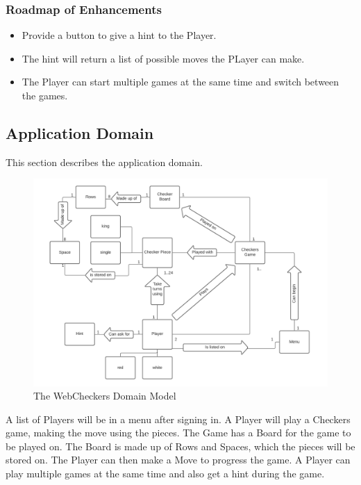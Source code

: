 \hypertarget{roadmap-of-enhancements}{%
\subsubsection{Roadmap of Enhancements}\label{roadmap-of-enhancements}}

\begin{itemize}
\tightlist
\item
  Provide a button to give a hint to the Player.
\item
  The hint will return a list of possible moves the PLayer can make.
\item
  The Player can start multiple games at the same time and switch
  between the games.
\end{itemize}

\hypertarget{application-domain}{%
\subsection{Application Domain}\label{application-domain}}

This section describes the application domain.

\begin{figure}[H]
\centering
\includegraphics{domain-model.png}
\caption{The WebCheckers Domain Model}
\end{figure}

A list of Players will be in a menu after signing in. A Player will play
a Checkers game, making the move using the pieces. The Game has a Board
for the game to be played on. The Board is made up of Rows and Spaces,
which the pieces will be stored on. The Player can then make a Move to
progress the game. A Player can play multiple games at the same time and
also get a hint during the game.

